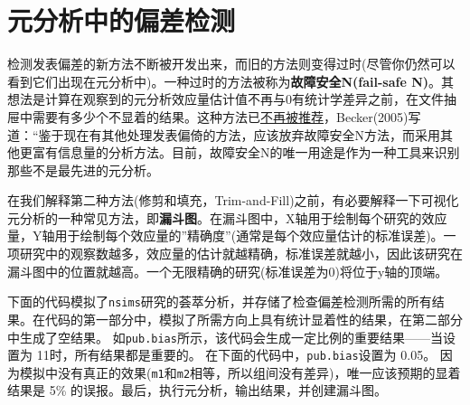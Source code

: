 \documentclass[
  letterpaper,
  DIV=11,
  numbers=noendperiod]{scrreprt}
\begin{document}
\hypertarget{ux5143ux5206ux6790ux4e2dux7684ux504fux5deeux68c0ux6d4b}{%
\section{元分析中的偏差检测}\label{ux5143ux5206ux6790ux4e2dux7684ux504fux5deeux68c0ux6d4b}}

检测发表偏差的新方法不断被开发出来，而旧的方法则变得过时(尽管你仍然可以看到它们出现在元分析中)。一种过时的方法被称为\textbf{故障安全N(fail-safe
N)}。其想法是计算在观察到的元分析效应量估计值不再与0有统计学差异之前，在文件抽屉中需要有多少个不显着的结果。这种方法已\href{https://handbook-5-1.cochrane.org/chapter_10/10_4_4_3_fail_safe_n.htm}{不再被推荐}，Becker(2005)写道：``鉴于现在有其他处理发表偏倚的方法，应该放弃故障安全N方法，而采用其他更富有信息量的分析方法。目前，故障安全N的唯一用途是作为一种工具来识别那些不是最先进的元分析。

在我们解释第二种方法(修剪和填充，Trim-and-Fill)之前，有必要解释一下可视化元分析的一种常见方法，即\textbf{漏斗图}。在漏斗图中，X轴用于绘制每个研究的效应量，Y轴用于绘制每个效应量的''精确度''(通常是每个效应量估计的标准误差)。一项研究中的观察数越多，效应量的估计就越精确，标准误差就越小，因此该研究在漏斗图中的位置就越高。一个无限精确的研究(标准误差为0)将位于y轴的顶端。

下面的代码模拟了\texttt{nsims}研究的荟萃分析，并存储了检查偏差检测所需的所有结果。在代码的第一部分中，模拟了所需方向上具有统计显着性的结果，在第二部分中生成了空结果。
如\texttt{pub.bias}所示，该代码会生成一定比例的重要结果------当设置为
11时，所有结果都是重要的。 在下面的代码中，\texttt{pub.bias}设置为
0.05。
因为模拟中没有真正的效果(\texttt{m1}和\texttt{m2}相等，所以组间没有差异)，唯一应该预期的显着结果是
5\% 的误报。最后，执行元分析，输出结果，并创建漏斗图。
\end{document}
